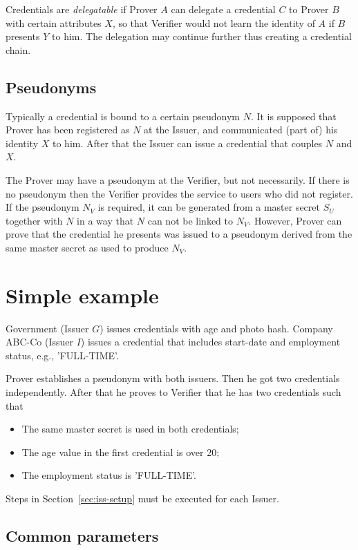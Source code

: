 \documentclass[a4paper]{article}
\begin{document}
Credentials are \emph{delegatable} if Prover $A$ can delegate a credential $C$ to Prover $B$ with certain attributes $X$, so that Verifier would not learn the identity of $A$ if $B$ presents $Y$ to him. The delegation may continue further thus creating a credential chain. 

\subsection{Pseudonyms}
Typically a credential is bound to a certain pseudonym $N$. It is supposed that Prover has been registered as $N$ at the Issuer, and communicated (part of) his identity $X$ to him. After  that the Issuer can issue a credential that couples $N$ and $X$. 

The Prover may have a pseudonym at the Verifier, but not necessarily. If there is no pseudonym then the Verifier provides the service to users who did not register. If the pseudonym $N_V$ is required, it can be generated from a master secret $S_U$ together with $N$ in a way that $N$ can not be linked to $N_V$. However, Prover can prove that the credential  he presents was issued to a pseudonym derived from the same master secret as used to produce $N_V$.

\section{Simple example}

 Government (Issuer $G$) issues credentials with age and photo hash. Company ABC-Co (Issuer $I$) issues a credential that includes start-date and employment status, e.g., 'FULL-TIME'.
 
Prover establishes a pseudonym with both issuers. Then he got two credentials independently. After that he proves
to Verifier that he has two credentials such that
\begin{itemize}
\item The same master secret is used in both credentials;
\item The age value in the first credential is over 20;
\item The employment status is 'FULL-TIME'.
\end{itemize}

Steps in Section~\ref{sec:iss-setup} must be executed for each Issuer.

\subsection{Common parameters}
\end{document}

